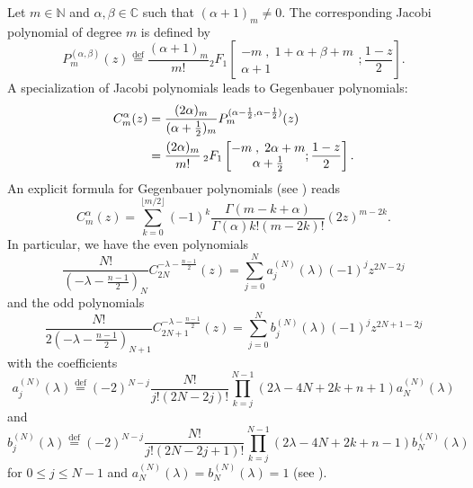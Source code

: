 \documentclass[a4paper,12pt,reqno]{amsart}
\numberwithin{theorem}{subsection}
\numberwithin{equation}{section}
\begin{document}
Let $m\in{\mathbb{N}}$ and $\alpha, \beta \in {\mathbb{C}}$ such that $(\alpha+1)_m \neq 0$. The
corresponding Jacobi polynomial of degree $m$ is defined by
\begin{equation}\label{jac}
   P_m^{(\alpha,\beta)}(z) {\stackrel{\text{def}}{=}} \frac{(\alpha+1)_m}{m!} {}_2F_1
   \left[\begin{matrix}-m\;,\;1+\alpha+\beta+m\\\alpha+1\end{matrix};\frac{1-z}{2}\right].
\end{equation}
A specialization of Jacobi polynomials leads to Gegenbauer polynomials:
\begin{align}
   C_m^{\alpha}(z) & = \frac{(2\alpha)_m}{(\alpha+\frac 12)_m} P_m^{(\alpha-\frac 12,\alpha-\frac 12)}(z)\notag\\
   & = \frac{(2\alpha)_{m}}{m!}
   \,_2F_1\left[\begin{matrix}-m\;,\;2\alpha+m\\ \alpha+\tfrac{1}{2}\end{matrix};\frac{1-z}{2}\right].
\end{align}
An explicit formula for Gegenbauer polynomials (see \cite[Section $3.15$,
formula $(9)$]{batemanerdelyi}) reads
\begin{equation}\label{Gegenbauer-Taylor}
   C_m^{\alpha}(z)=\sum_{k=0}^{\lfloor m/2\rfloor} (-1)^k \frac{\Gamma(m-k+\alpha)}
   {\Gamma(\alpha)k!(m\!-\!2k)!} (2z)^{m-2k}.
\end{equation}
In particular, we have the even polynomials
\begin{equation*}
   \frac{N!}{(-\lambda\!-\!\frac{n-1}{2})_N} C_{2N}^{-\lambda-\frac{n-1}{2}}(z)
   = \sum_{j=0}^N a_j^{(N)}(\lambda) (-1)^j z^{2N-2j}
\end{equation*}
and the odd polynomials
\begin{equation*}
   \frac{N!}{2(-\lambda\!-\!\frac{n-1}{2})_{N+1}} C_{2N+1}^{-\lambda-\frac{n-1}{2}}(z)
   = \sum_{j=0}^N b_j^{(N)}(\lambda)(-1)^j z^{2N+1-2j}
\end{equation*}
with the coefficients
\begin{equation}\label{eq:DefA}
   a_j^{(N)}(\lambda) {\stackrel{\text{def}}{=}} (-2)^{N-j} \frac{N!}{j!(2N\!-\!2j)!}
   \prod_{k=j}^{N-1}(2\lambda\!-\!4N\!+\!2k\!+\!n\!+\!1) a_N^{(N)}(\lambda)
\end{equation}
and
\begin{equation}\label{eq:DefB}
   b_j^{(N)}(\lambda){\stackrel{\text{def}}{=}} (-2)^{N-j} \frac{N!}{j!(2N\!-\!2j\!+\!1)!}
   \prod_{k=j}^{N-1}(2\lambda\!-\!4N\!+\!2k\!+\!n\!-\!1) b_N^{(N)}(\lambda)
\end{equation}
for $0\leq j\leq N-1$ and $a_N^{(N)}(\lambda) = b_N^{(N)}(\lambda)=1$ (see
\cite[Theorems 5.1.2, 5.1.4]{Juhl}).
\end{document}
